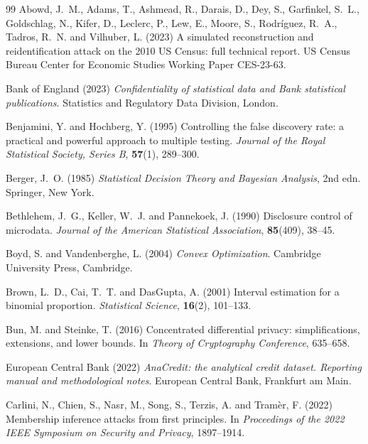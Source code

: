 \documentclass[11pt,a4paper]{article}
\theoremstyle{plain}
\theoremstyle{definition}
\begin{document}
\begin{thebibliography}{99}
Abowd, J.~M., Adams, T., Ashmead, R., Darais, D., Dey, S., Garfinkel, S.~L.,
Goldschlag, N., Kifer, D., Leclerc, P., Lew, E., Moore, S., Rodr\'iguez, R.~A.,
Tadros, R.~N. and Vilhuber, L. (2023) A simulated reconstruction and
reidentification attack on the 2010 US Census: full technical report. US Census
Bureau Center for Economic Studies Working Paper CES-23-63.

Bank of England (2023) \emph{Confidentiality of statistical data and Bank
statistical publications}. Statistics and Regulatory Data Division, London.

Benjamini, Y. and Hochberg, Y. (1995) Controlling the false discovery rate: a
practical and powerful approach to multiple testing. \emph{Journal of the Royal
Statistical Society, Series B}, \textbf{57}(1), 289--300.

Berger, J.~O. (1985) \emph{Statistical Decision Theory and Bayesian Analysis},
2nd edn. Springer, New York.

Bethlehem, J.~G., Keller, W.~J. and Pannekoek, J. (1990) Disclosure control of
microdata. \emph{Journal of the American Statistical Association},
\textbf{85}(409), 38--45.

Boyd, S. and Vandenberghe, L. (2004) \emph{Convex Optimization}. Cambridge
University Press, Cambridge.

Brown, L.~D., Cai, T.~T. and DasGupta, A. (2001) Interval estimation for a
binomial proportion. \emph{Statistical Science}, \textbf{16}(2), 101--133.

Bun, M. and Steinke, T. (2016) Concentrated differential privacy:
simplifications, extensions, and lower bounds. In \emph{Theory of Cryptography
Conference}, 635--658.

European Central Bank (2022) \emph{AnaCredit: the analytical credit dataset.
Reporting manual and methodological notes}. European Central Bank, Frankfurt am
Main.

Carlini, N., Chien, S., Nasr, M., Song, S., Terzis, A. and Tram\`er, F. (2022)
Membership inference attacks from first principles. In \emph{Proceedings of the
2022 IEEE Symposium on Security and Privacy}, 1897--1914.


\end{thebibliography}
\end{document}
